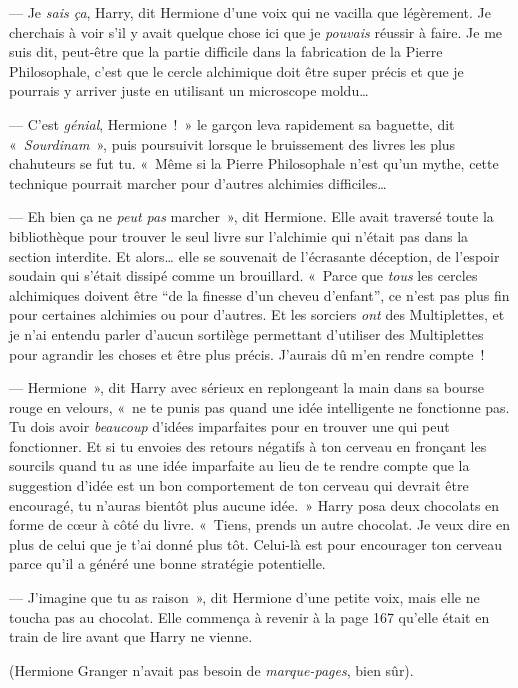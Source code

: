 --- Je \emph{sais ça}, Harry, dit Hermione d'une voix qui ne vacilla que légèrement. Je cherchais à voir s'il y avait quelque chose ici que je \emph{pouvais} réussir à faire. Je me suis dit, peut-être que la partie difficile dans la fabrication de la Pierre Philosophale, c'est que le cercle alchimique doit être super précis et que je pourrais y arriver juste en utilisant un microscope moldu…

--- C'est \emph{génial}, Hermione~!~» le garçon leva rapidement sa baguette, dit «~\emph{Sourdinam}~», puis poursuivit lorsque le bruissement des livres les plus chahuteurs se fut tu. «~Même si la Pierre Philosophale n'est qu'un mythe, cette technique pourrait marcher pour d'autres alchimies difficiles…

--- Eh bien ça ne \emph{peut pas} marcher~», dit Hermione. Elle avait traversé toute la bibliothèque pour trouver le seul livre sur l'alchimie qui n'était pas dans la section interdite. Et alors… elle se souvenait de l'écrasante déception, de l'espoir soudain qui s'était dissipé comme un brouillard. «~Parce que \emph{tous} les cercles alchimiques doivent être “de la finesse d'un cheveu d'enfant”, ce n'est pas plus fin pour certaines alchimies ou pour d'autres. Et les sorciers \emph{ont} des Multiplettes, et je n'ai entendu parler d'aucun sortilège permettant d'utiliser des Multiplettes pour agrandir les choses et être plus précis. J'aurais dû m'en rendre compte~!

--- Hermione~», dit Harry avec sérieux en replongeant la main dans sa bourse rouge en velours, «~ne te punis pas quand une idée intelligente ne fonctionne pas. Tu dois avoir \emph{beaucoup} d'idées imparfaites pour en trouver une qui peut fonctionner. Et si tu envoies des retours négatifs à ton cerveau en fronçant les sourcils quand tu as une idée imparfaite au lieu de te rendre compte que la suggestion d'idée est un bon comportement de ton cerveau qui devrait être encouragé, tu n'auras bientôt plus aucune idée.~» Harry posa deux chocolats en forme de cœur à côté du livre. «~Tiens, prends un autre chocolat. Je veux dire en plus de celui que je t'ai donné plus tôt. Celui-là est pour encourager ton cerveau parce qu'il a généré une bonne stratégie potentielle.

--- J'imagine que tu as raison~», dit Hermione d'une petite voix, mais elle ne toucha pas au chocolat. Elle commença à revenir à la page 167 qu'elle était en train de lire avant que Harry ne vienne.

(Hermione Granger n'avait pas besoin de \emph{marque-pages}, bien sûr).

